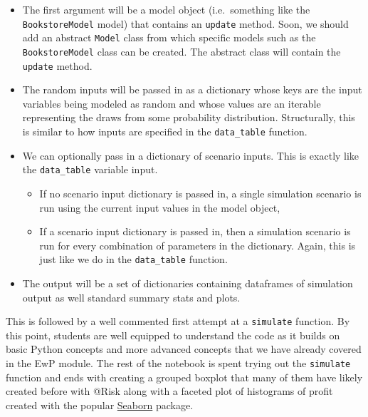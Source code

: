 \documentclass[ited,blindrev]{informs3}              %
\newcommand{\code}[1]{\texttt{#1}}
\begin{document}
\begin{itemize}
	\item
	The first argument will be a model object (i.e.~something like the
	\code{BookstoreModel} model) that contains an \code{update}
	method. Soon, we should add an abstract \code{Model} class from
	which specific models such as the \texttt{BookstoreModel} class can be
	created. The abstract class will contain the \code{update} method.
	\item
	The random inputs will be passed in as a dictionary whose keys are the
	input variables being modeled as random and whose values are an
	iterable representing the draws from some probability distribution.
	Structurally, this is similar to how inputs are specified in the
	\code{data\_table} function.
	\item
	We can optionally pass in a dictionary of scenario inputs. This is
	exactly like the \code{data\_table} variable input.
	
	\begin{itemize}
		\item
		If no scenario input dictionary is passed in, a single simulation
		scenario is run using the current input values in the model object,
		\item
		If a scenario input dictionary is passed in, then a simulation
		scenario is run for every combination of parameters in the
		dictionary. Again, this is just like we do in the
		\code{data\_table} function.
	\end{itemize}
	\item
	The output will be a set of dictionaries containing dataframes of
	simulation output as well standard summary stats and plots.
\end{itemize}

This is followed by a well commented first attempt at a \code{simulate} function. By this point, students are well equipped to understand the code as it builds on basic Python concepts and more advanced concepts that we have already covered in the EwP module. The rest of the notebook is spent trying out the \code{simulate} function and ends with creating a grouped boxplot that many of them have likely created before with @Risk along with a faceted plot of histograms of profit created with the popular \href{https://seaborn.pydata.org/}{Seaborn} package.
\end{document}
